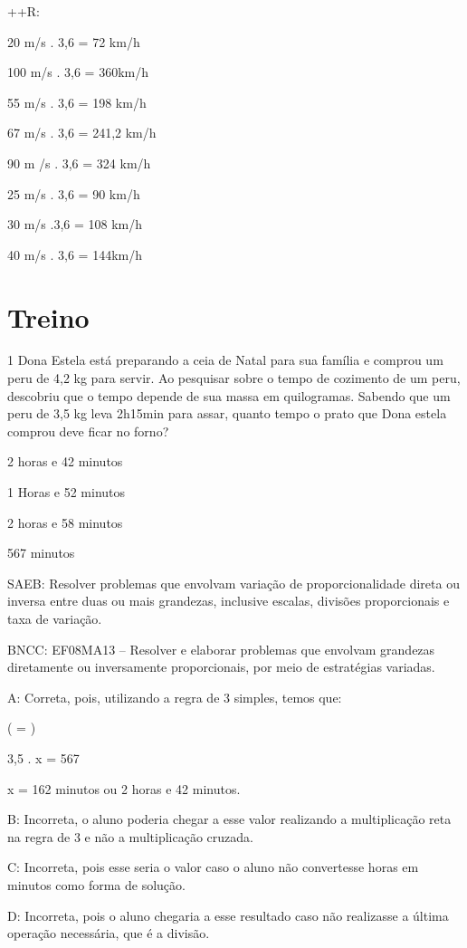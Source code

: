 {++R:
\item 20 m/s . 3,6 = 72 km/h
\item 100 m/s . 3,6 = 360km/h
\item 55 m/s . 3,6 = 198 km/h
\item 67 m/s . 3,6 = 241,2 km/h
\item 90 m /s . 3,6 = 324 km/h
\item 25 m/s . 3,6 = 90 km/h
\item 30 m/s .3,6 = 108 km/h
\item 40 m/s . 3,6 = 144km/h

\section{Treino}

\num{1} Dona Estela está preparando a ceia de Natal para sua família e
comprou um peru de 4,2 kg para servir. Ao pesquisar sobre o tempo de
cozimento de um peru, descobriu que o tempo depende de sua massa em
quilogramas. Sabendo que um peru de 3,5 kg leva 2h15min para assar,
quanto tempo o prato que Dona estela comprou deve ficar no forno?
\item 2 horas e 42 minutos
\item 1 Horas e 52 minutos
\item 2 horas e 58 minutos
\item 567 minutos

SAEB: Resolver problemas que envolvam variação de proporcionalidade
direta ou inversa entre duas ou mais grandezas, inclusive escalas,
divisões proporcionais e taxa de variação.

BNCC: EF08MA13 -- Resolver e elaborar problemas que envolvam grandezas
diretamente ou inversamente proporcionais, por meio de estratégias
variadas.

A: Correta, pois, utilizando a regra de 3 simples, temos que:

( = )

3,5 . x = 567

x = 162 minutos ou 2 horas e 42 minutos.

B: Incorreta, o aluno poderia chegar a esse valor realizando a
multiplicação reta na regra de 3 e não a multiplicação cruzada.

C: Incorreta, pois esse seria o valor caso o aluno não convertesse horas
em minutos como forma de solução.

D: Incorreta, pois o aluno chegaria a esse resultado caso não realizasse
a última operação necessária, que é a divisão.

}
